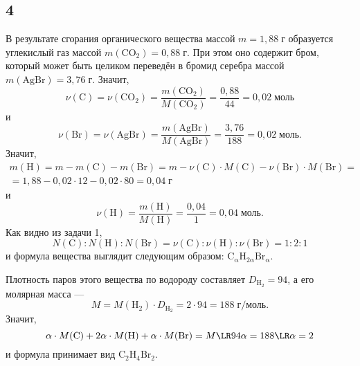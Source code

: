 \subsection{4}

В результате сгорания органического вещества массой $m=1{,}88\;\text{г}$ образуется углекислый газ массой $m(\mathrm{CO_2})=0{,}88\;\text{г}$. При этом оно содержит бром, который может быть целиком переведён в бромид серебра массой $m(\mathrm{AgBr})=3{,}76\;\text{г}$. Значит,
\[
\nu(\mathrm{C})=\nu(\mathrm{CO_2})=\frac{m(\mathrm{CO_2})}{M(\mathrm{CO_2})}=\frac{0{,}88}{44}=0{,}02\;\text{моль}
\]
и
\[
\nu(\mathrm{Br})=\nu(\mathrm{AgBr})=\frac{m(\mathrm{AgBr})}{M(\mathrm{AgBr})}=\frac{3{,}76}{188}=0{,}02\;\text{моль}.
\]
Значит,
\begin{multline*}
m(\mathrm{H})=m-m(\mathrm{C})-m(\mathrm{Br})=m-\nu(\mathrm{C})\cdot M(\mathrm{C})-\nu(\mathrm{Br})\cdot M(\mathrm{Br})= \\
=1{,}88-0{,}02\cdot12-0{,}02\cdot80=0{,}04\;\text{г}
\end{multline*}
и
\[
\nu(\mathrm{H})=\frac{m(\mathrm{H})}{M(\mathrm{H})}=\frac{0{,}04}{1}=0{,}04\;\text{моль}.
\]
Как видно из задачи 1,
\[
N(\mathrm{C}):N(\mathrm{H}):N(\mathrm{Br})=\nu(\mathrm{C}):\nu(\mathrm{H}):\nu(\mathrm{Br})=1:2:1
\]
и формула вещества выглядит следующим образом: $\mathrm{C_\alpha H_{2\alpha}Br_\alpha}$.

Плотность паров этого вещества по водороду составляет $D_\mathrm{H_2}=94$, а его молярная масса ---
\[
M=M(\mathrm{H_2})\cdot D_\mathrm{H_2}=2\cdot94=188\;\text{г/моль}.
\]
Значит,
\[
\alpha\cdot M(\mathrm{C})+2\alpha\cdot M(\mathrm{H})+\alpha\cdot M(\mathrm{Br})=M\LR94\alpha=188\LR\alpha=2
\]
и формула принимает вид $\mathrm{C_2H_4Br_2}$.